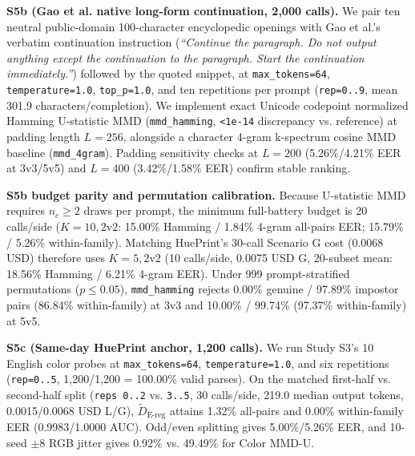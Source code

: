\documentclass[10pt,letterpaper]{article}
\theoremstyle{definition}
\newcommand{\Dereg}{\tilde D_{\mathrm{E\mbox{-}reg}}}
\begin{document}
\textbf{S5b (Gao et al. \cite{ref4} native long-form continuation, 2,000 calls).} We pair ten neutral public-domain 100-character encyclopedic openings with Gao et al.'s verbatim continuation instruction (\emph{``Continue the paragraph. Do not output anything except the continuation to the paragraph. Start the continuation immediately.''}) followed by the quoted snippet, at \texttt{max\_\allowbreak{}tokens=\allowbreak{}64}, \texttt{temperature=\allowbreak{}1.\allowbreak{}0}, \texttt{top\_\allowbreak{}p=\allowbreak{}1.\allowbreak{}0}, and ten repetitions per prompt (\texttt{rep=\allowbreak{}0.\allowbreak{}.\allowbreak{}9}, mean 301.9 characters/completion). We implement exact Unicode codepoint normalized Hamming U-statistic MMD (\texttt{mmd\_\allowbreak{}hamming}, \texttt{<1e-\allowbreak{}14} discrepancy vs. reference) at padding length $L=256$, alongside a character 4-gram k-spectrum cosine MMD baseline (\texttt{mmd\_\allowbreak{}4gram}). Padding sensitivity checks at $L=200$ (5.26\%/4.21\% EER at 3v3/5v5) and $L=400$ (3.42\%/1.58\% EER) confirm stable ranking.


\textbf{S5b budget parity and permutation calibration.} Because U-statistic MMD requires $n_c \ge 2$ draws per prompt, the minimum full-battery budget is 20 calls/side ($K=10, 2\text{v}2$: 15.00\% Hamming / 1.84\% 4-gram all-pairs EER; 15.79\% / 5.26\% within-family). Matching HuePrint's 30-call Scenario G cost (0.0068 USD) therefore uses $K=5, 2\text{v}2$ (10 calls/side, 0.0075 USD G, 20-subset mean: 18.56\% Hamming / 6.21\% 4-gram EER). Under 999 prompt-stratified permutations ($p \le 0.05$), \texttt{mmd\_\allowbreak{}hamming} rejects 0.00\% genuine / 97.89\% impostor pairs (86.84\% within-family) at 3v3 and 10.00\% / 99.74\% (97.37\% within-family) at 5v5.


\textbf{S5c (Same-day HuePrint anchor, 1,200 calls).} We run Study S3's 10 English color probes at \texttt{max\_\allowbreak{}tokens=\allowbreak{}64}, \texttt{temperature=\allowbreak{}1.\allowbreak{}0}, and six repetitions (\texttt{rep=\allowbreak{}0.\allowbreak{}.\allowbreak{}5}, 1,200/1,200 = 100.00\% valid parses). On the matched first-half vs. second-half split (\texttt{reps 0.\allowbreak{}.\allowbreak{}2} vs. \texttt{3.\allowbreak{}.\allowbreak{}5}, 30 calls/side, 219.0 median output tokens, 0.0015/0.0068 USD L/G), $\Dereg{}$ attains 1.32\% all-pairs and 0.00\% within-family EER (0.9983/1.0000 AUC). Odd/even splitting gives 5.00\%/5.26\% EER, and 10-seed $\pm 8$ RGB jitter gives 0.92\% vs. 49.49\% for Color MMD-U.
\end{document}

